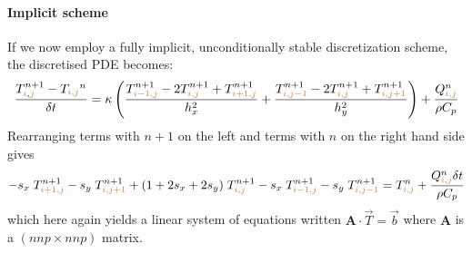 \paragraph{Implicit scheme} 
If we now employ a fully implicit, unconditionally stable discretization scheme, the discretised 
PDE becomes:
\[
\frac{T_{{\color{brown}i},{\color{brown}j}}^{n+1}-T_{\color{brown}i,j}^n}{\delta t}
= \kappa
\left(
\frac{ T_{{\color{brown}i-1,j}}^{n+1}-2T_{{\color{brown}i,j}}^{n+1}+T_{{\color{brown}i+1,j}}^{n+1} }{h_x^2} + 
\frac{ T_{{\color{brown}i,j-1}}^{n+1}-2T_{{\color{brown}i,j}}^{n+1}+T_{{\color{brown}i,j+1}}^{n+1} }{h_y^2}
\right)
+\frac{Q_{{\color{brown}i,j}}^n}{\rho C_p}
\]
Rearranging terms with $n+1$ on the left and terms with $n$ on the right hand side gives
\[
-s_x\; T_{{\color{brown}i+1,j}}^{n+1}
-s_y\; T_{{\color{brown}i,j+1}}^{n+1} 
+(1+2s_x+2s_y)\; T_{{\color{brown}i,j}}^{n+1} 
-s_x\;  T_{{\color{brown}i-1,j}}^{n+1} 
-s_y\;  T_{{\color{brown}i,j-1}}^{n+1} 
=
T_{{\color{brown}i,j}}^n
+\frac{Q_{{\color{brown}i,j}}^n \delta t}{\rho C_p}
\]
which here again yields a linear system of equations written ${\bm A}\cdot {\vec T} = {\vec b}$
where ${\bm A}$ is a $(nnp \times nnp)$ matrix.



